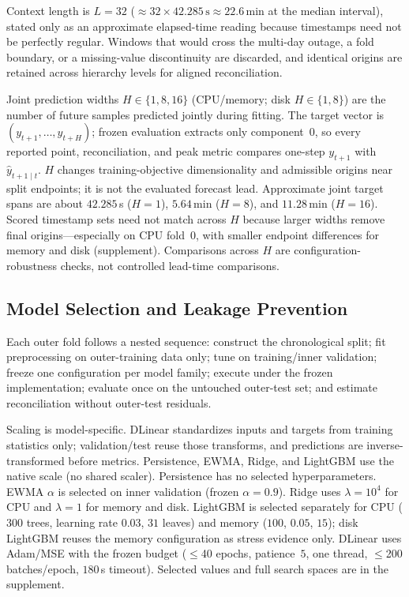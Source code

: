 \documentclass[a4paper,fleqn]{cas-dc}
\begin{document}
Context length is $L=32$
($\approx 32\times 42.285\,\mathrm{s}\approx 22.6$\,min at the median interval),
stated only as an approximate elapsed-time reading because timestamps need not be
perfectly regular.
Windows that would cross the multi-day outage, a fold boundary, or a
missing-value discontinuity are discarded, and identical origins are retained
across hierarchy levels for aligned reconciliation.

Joint prediction widths $H\in\{1,8,16\}$ ({CPU}/memory; disk $H\in\{1,8\}$)
are the number of future samples predicted jointly during fitting.
The target vector is $(y_{t+1},\ldots,y_{t+H})$; frozen evaluation extracts only
component~$0$, so every reported point, reconciliation, and peak metric compares
one-step $y_{t+1}$ with $\hat y_{t+1\mid t}$.
$H$ changes training-objective dimensionality and admissible origins near split
endpoints; it is not the evaluated forecast lead.
Approximate joint target spans are about $42.285$\,s ($H{=}1$), $5.64$\,min
($H{=}8$), and $11.28$\,min ($H{=}16$).
Scored timestamp sets need not match across $H$ because larger widths remove
final origins---especially on {CPU} fold~$0$, with smaller endpoint differences
for memory and disk (supplement).
Comparisons across $H$ are configuration-robustness checks, not controlled
lead-time comparisons.

\subsection{Model Selection and Leakage Prevention}
Each outer fold follows a nested sequence: construct the chronological split;
fit preprocessing on outer-training data only; tune on training/inner
validation; freeze one configuration per model family; execute under the frozen
implementation; evaluate once on the untouched outer-test set; and estimate
reconciliation without outer-test residuals.

Scaling is model-specific.
DLinear standardizes inputs and targets from training statistics only;
validation/test reuse those transforms, and predictions are inverse-transformed
before metrics.
Persistence, {EWMA}, Ridge, and LightGBM use the native scale (no shared
scaler).
Persistence has no selected hyperparameters.
{EWMA} $\alpha$ is selected on inner validation (frozen $\alpha{=}0.9$).
Ridge uses $\lambda{=}10^{4}$ for {CPU} and $\lambda{=}1$ for memory and disk.
LightGBM is selected separately for {CPU}
($300$ trees, learning rate $0.03$, $31$ leaves) and memory
($100$, $0.05$, $15$); disk LightGBM reuses the memory configuration as stress
evidence only.
DLinear uses Adam/{MSE} with the frozen budget ($\le$40 epochs, patience~$5$,
one thread, $\le$200 batches/epoch, $180$\,s timeout).
Selected values and full search spaces are in the supplement.
\end{document}
